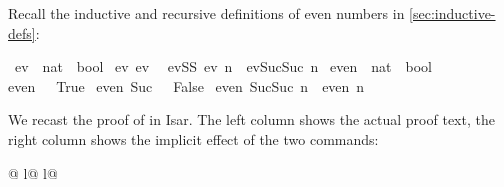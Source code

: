 \begin{isabellebody}
\begin{isamarkuptext}
Recall the inductive and recursive definitions of even numbers in
\autoref{sec:inductive-defs}:%
\end{isamarkuptext}%
\isamarkuptrue%
\isamarkupfalse%
\ ev\ {}{}\ {}nat\ {}\ bool{}\ \isanewline
ev{}{}\ {}ev\ {}{}\ {}\isanewline
evSS{}\ {}ev\ n\ {}\ ev{}Suc{}Suc\ n{}{}{}\isanewline
\isanewline
{}\isamarkupfalse%
\ even\ {}{}\ {}nat\ {}\ bool{}\ \isanewline
{}even\ {}\ {}\ True{}\ {}\isanewline
{}even\ {}Suc\ {}{}\ {}\ False{}\ {}\isanewline
{}even\ {}Suc{}Suc\ n{}{}\ {}\ even\ n{}%
\begin{isamarkuptext}%
We recast the proof of  in Isar. The
left column shows the actual proof text, the right column shows
the implicit effect of the two  commands:%
\end{isamarkuptext}%
\isamarkuptrue%
%
\begin{tabular}{@ {}l@ {\qquad}l@ {}}
\begin{minipage}[t]{.5\textwidth}

\end{minipage}
\end{tabular}
\end{isabellebody}
